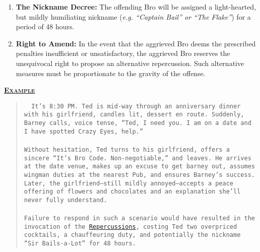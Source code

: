 \begin{enumerate}
    \item \textbf{The Nickname Decree:}
    The offending Bro will be assigned a light-hearted, but mildly humiliating nickname (\textit{e.g. “Captain Bail” or “The Flake”}) for a period of 48 hours.

    \item \textbf{Right to Amend:}
    In the event that the aggrieved Bro deems the prescribed penalties insufficient or unsatisfactory, the aggrieved Bro reserves the unequivocal right to propose an alternative repercussion. Such alternative measures must be proportionate to the gravity of the offense.
\end{enumerate}

\vspace{25pt}

\lettrine{}{\underline{\textbf{\large{Example}}}}\vspace{5pt}

\begin{quote}
    \tt{
        \small{
            It’s 8:30 PM. Ted is mid-way through an anniversary dinner with his girlfriend, candles lit, dessert en route. Suddenly, Barney calls, voice tense, “Ted, I need you. I am on a date and I have spotted Crazy Eyes, help.”\\\\ \noindent Without hesitation, Ted turns to his girlfriend, offers a sincere “It’s Bro Code. Non-negotiable,” and leaves. He arrives at the date venue, makes up an excuse to get barney out, assumes wingman duties at the nearest Pub, and ensures Barney's success. Later, the girlfriend—still mildly annoyed—accepts a peace offering of flowers and chocolates and an explanation she’ll never fully understand.\\\\ \noindent Failure to respond in such a scenario would have resulted in the invocation of the \hyperref[Article1-Repercussions]{Repercussions}, costing Ted two overpriced cocktails, a chauffeuring duty, and potentially the nickname “Sir Bails-a-Lot” for 48 hours.
        }
    }
\end{quote}